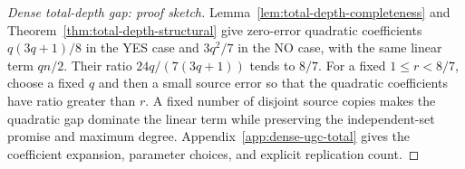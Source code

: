 \begin{proof}[Dense total-depth gap: proof sketch]
Lemma~\ref{lem:total-depth-completeness} and
Theorem~\ref{thm:total-depth-structural} give zero-error quadratic
coefficients $q(3q+1)/8$ in the YES case and $3q^2/7$ in the NO
case, with the same linear term $qn/2$. Their ratio
$24q/(7(3q+1))$ tends to $8/7$. For a fixed $1\leq r<8/7$,
choose a fixed $q$ and then a small
source error so that the quadratic coefficients have ratio greater
than $r$. A fixed number of disjoint source copies
makes the quadratic gap dominate the linear term while preserving
the independent-set promise and maximum degree.
Appendix~\ref{app:dense-ugc-total} gives the coefficient expansion,
parameter choices, and explicit replication count.
\end{proof}
